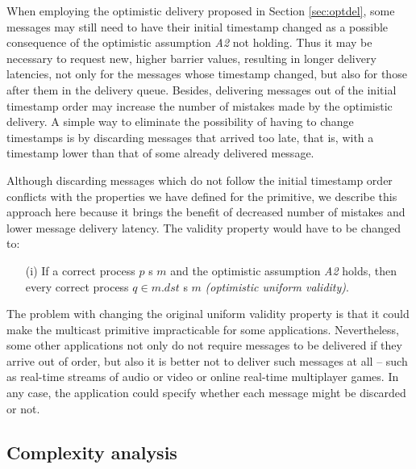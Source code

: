 \documentclass[times, 10pt]{article}
\begin{document}
When employing the optimistic delivery proposed in Section \ref{sec:optdel}, some messages may still need to have their initial timestamp changed as a possible consequence of the optimistic assumption \emph{A2} not holding. Thus it may be necessary to request new, higher barrier values, resulting in longer delivery latencies, not only for the messages whose timestamp changed, but also for those after them in the delivery queue. Besides, delivering messages out of the initial timestamp order may increase the number of mistakes made by the optimistic delivery. A simple way to eliminate the possibility of having to change timestamps is by discarding messages that arrived too late, that is, with a timestamp lower than that of some already delivered message.

Although discarding messages which do not follow the initial timestamp order conflicts with the properties we have defined for the \amcast{} primitive, we describe this approach here because it brings the benefit of decreased number of mistakes and lower message delivery latency. The validity property would have to be changed to:

\begin{itemize}
  \item[(i)] If a correct process $p$ \amcast{}s $m$ and the optimistic assumption \emph{A2} holds, then  every correct process $q \in m.dst$ \amdel{}s $m$ \emph{(optimistic uniform validity)}.
\end{itemize}


The problem with changing the original uniform validity property is that it could make the multicast primitive impracticable for some applications. Nevertheless, some other applications not only do not require messages to be delivered if they arrive out of order, but also it is better not to deliver such messages at all -- such as real-time streams of audio or video or online real-time multiplayer games. In any case, the application could specify whether each message might be discarded or not.





\subsection{Complexity analysis}
\label{sec:complexity}
\end{document}
